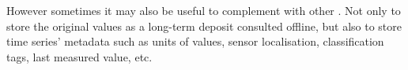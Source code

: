 However sometimes it may also be useful to complement 
with other . Not only to store the original values as a
long-term deposit consulted offline, but also to store time series'
metadata such as units of values, sensor localisation, classification
tags, last measured value, etc.








